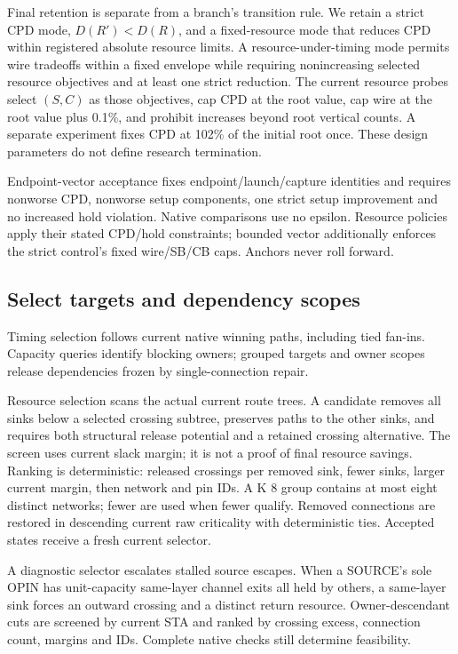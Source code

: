 \documentclass[conference,10pt]{IEEEtran}
\begin{document}
Final retention is separate from a branch's transition rule. We retain a strict CPD mode, $D(R')<D(R)$, and a fixed-resource mode that reduces CPD within registered absolute resource limits. A resource-under-timing mode permits wire tradeoffs within a fixed envelope while requiring nonincreasing selected resource objectives and at least one strict reduction. The current resource probes select $(S,C)$ as those objectives, cap CPD at the root value, cap wire at the root value plus 0.1\%, and prohibit increases beyond root vertical counts. A separate experiment fixes CPD at 102\% of the initial root once. These design parameters do not define research termination.

Endpoint-vector acceptance fixes endpoint/launch/capture identities and requires nonworse CPD, nonworse setup components, one strict setup improvement and no increased hold violation. Native comparisons use no epsilon. Resource policies apply their stated CPD/hold constraints; bounded vector additionally enforces the strict control's fixed wire/SB/CB caps. Anchors never roll forward.


\subsection{Select targets and dependency scopes}
Timing selection follows current native winning paths, including tied fan-ins. Capacity queries identify blocking owners; grouped targets and owner scopes release dependencies frozen by single-connection repair.

Resource selection scans the actual current route trees. A candidate removes all sinks below a selected crossing subtree, preserves paths to the other sinks, and requires both structural release potential and a retained crossing alternative. The screen uses current slack margin; it is not a proof of final resource savings. Ranking is deterministic: released crossings per removed sink, fewer sinks, larger current margin, then network and pin IDs. A K 8 group contains at most eight distinct networks; fewer are used when fewer qualify. Removed connections are restored in descending current raw criticality with deterministic ties. Accepted states receive a fresh current selector.

A diagnostic selector escalates stalled source escapes. When a SOURCE's sole OPIN has unit-capacity same-layer channel exits all held by others, a same-layer sink forces an outward crossing and a distinct return resource. Owner-descendant cuts are screened by current STA and ranked by crossing excess, connection count, margins and IDs. Complete native checks still determine feasibility.
\end{document}
